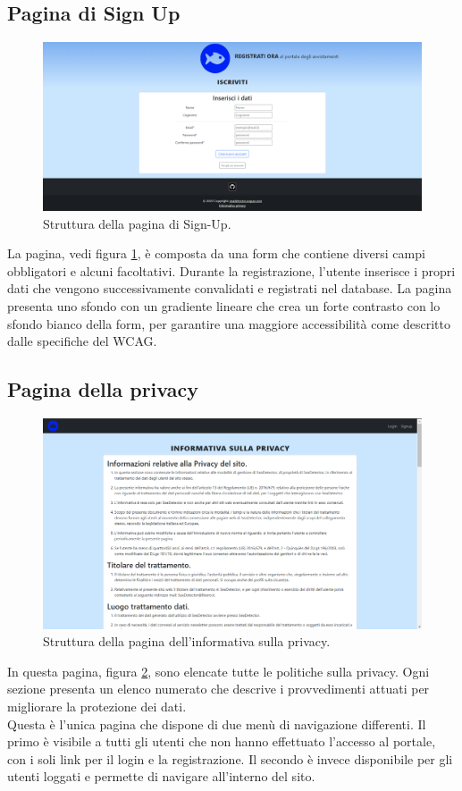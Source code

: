 \documentclass[a4paper,final,12pt]{report}
\begin{document}
\subsection{Pagina di Sign Up}
\begin{figure}[hbtp]
\centering
\includegraphics[scale=0.31]{img_concettuale/signup.png}
\caption{Struttura della pagina di Sign-Up.}
\label{figura:pagsignupsdd}
\end{figure}
La pagina, vedi figura \ref{figura:pagsignupsdd}, è composta da una form che contiene diversi campi obbligatori e alcuni facoltativi. Durante la registrazione, l'utente inserisce i propri dati che vengono successivamente convalidati e registrati nel database. La pagina presenta uno sfondo con un gradiente lineare che crea un forte contrasto con lo sfondo bianco della form, per garantire una maggiore accessibilità come descritto dalle specifiche del WCAG.

\newpage

\subsection{Pagina della privacy}
\begin{figure}[hbtp]
\centering
\includegraphics[scale=0.31]{img_concettuale/privacy.png}
\caption{Struttura della pagina dell'informativa sulla privacy.}
\label{figura:pagprivacyasd}
\end{figure}
In questa pagina, figura \ref{figura:pagprivacyasd}, sono elencate tutte le politiche sulla privacy. Ogni sezione presenta un elenco numerato che descrive i provvedimenti attuati per migliorare la protezione dei dati.\\ Questa è l'unica pagina che dispone di due menù di navigazione differenti. Il primo è visibile a tutti gli utenti che non hanno effettuato l'accesso al portale, con i soli link per il login e la registrazione. Il secondo è invece disponibile per gli utenti loggati e permette di navigare all'interno del sito.
\end{document}
